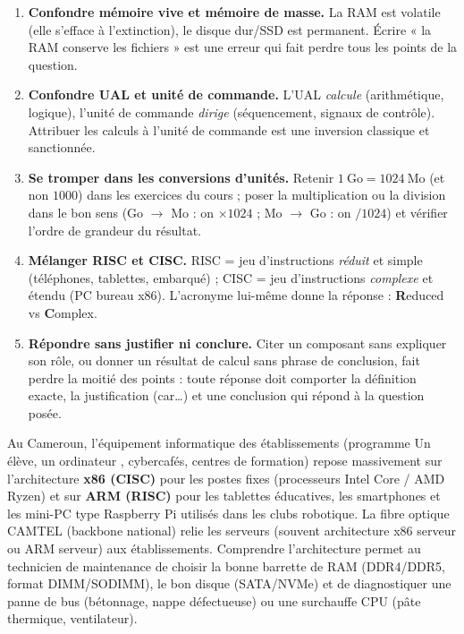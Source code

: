 \documentclass[11pt]{article}
\begin{document}
\begin{attention}
\begin{enumerate}
\item \textbf{Confondre mémoire vive et mémoire de masse.} La RAM est volatile (elle s'efface à l'extinction), le disque dur/SSD est permanent. Écrire « la RAM conserve les fichiers » est une erreur qui fait perdre tous les points de la question.
\item \textbf{Confondre UAL et unité de commande.} L'UAL \emph{calcule} (arithmétique, logique), l'unité de commande \emph{dirige} (séquencement, signaux de contrôle). Attribuer les calculs à l'unité de commande est une inversion classique et sanctionnée.
\item \textbf{Se tromper dans les conversions d'unités.} Retenir $1\ \text{Go} = 1024\ \text{Mo}$ (et non $1000$) dans les exercices du cours ; poser la multiplication ou la division dans le bon sens (Go $\rightarrow$ Mo : on $\times 1024$ ; Mo $\rightarrow$ Go : on $/ 1024$) et vérifier l'ordre de grandeur du résultat.
\item \textbf{Mélanger RISC et CISC.} RISC = jeu d'instructions \emph{réduit} et simple (téléphones, tablettes, embarqué) ; CISC = jeu d'instructions \emph{complexe} et étendu (PC bureau x86). L'acronyme lui-même donne la réponse : \textbf{R}educed vs \textbf{C}omplex.
\item \textbf{Répondre sans justifier ni conclure.} Citer un composant sans expliquer son rôle, ou donner un résultat de calcul sans phrase de conclusion, fait perdre la moitié des points : toute réponse doit comporter la définition exacte, la justification (\og car\ldots \fg{}) et une conclusion qui répond à la question posée.
\end{enumerate}
\end{attention}

\begin{savaistu}
Au Cameroun, l'équipement informatique des établissements (programme \og Un élève, un ordinateur \fg{}, cybercafés, centres de formation) repose massivement sur l'architecture \textbf{x86 (CISC)} pour les postes fixes (processeurs Intel Core / AMD Ryzen) et sur \textbf{ARM (RISC)} pour les tablettes éducatives, les smartphones et les mini-PC type Raspberry Pi utilisés dans les clubs robotique. La fibre optique CAMTEL (backbone national) relie les serveurs (souvent architecture x86 serveur ou ARM serveur) aux établissements. Comprendre l'architecture permet au technicien de maintenance de choisir la bonne barrette de RAM (DDR4/DDR5, format DIMM/SODIMM), le bon disque (SATA/NVMe) et de diagnostiquer une panne de bus (bétonnage, nappe défectueuse) ou une surchauffe CPU (pâte thermique, ventilateur).
\end{savaistu}
\end{document}
